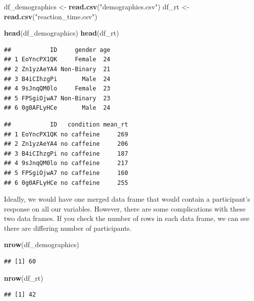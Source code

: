 \documentclass[
]{book}
\newenvironment{Shaded}{\begin{snugshade}}{\end{snugshade}}
\newcommand{\FunctionTok}[1]{\textcolor[rgb]{0.13,0.29,0.53}{\textbf{#1}}}
\newcommand{\NormalTok}[1]{#1}
\newcommand{\OtherTok}[1]{\textcolor[rgb]{0.56,0.35,0.01}{#1}}
\newcommand{\StringTok}[1]{\textcolor[rgb]{0.31,0.60,0.02}{#1}}
\begin{document}
\begin{Shaded}
\begin{Highlighting}[]
\NormalTok{df\_demographics }\OtherTok{\textless{}{-}} \FunctionTok{read.csv}\NormalTok{(}\StringTok{"demographics.csv"}\NormalTok{)}
\NormalTok{df\_rt }\OtherTok{\textless{}{-}} \FunctionTok{read.csv}\NormalTok{(}\StringTok{"reaction\_time.csv"}\NormalTok{)}

\FunctionTok{head}\NormalTok{(df\_demographics)}
\FunctionTok{head}\NormalTok{(df\_rt)}
\end{Highlighting}
\end{Shaded}

\begin{verbatim}
##           ID     gender age
## 1 EoYncPX1QK     Female  24
## 2 Zn1yzAeYA4 Non-Binary  21
## 3 B4iCIhzgPi       Male  24
## 4 9sJnqQM0lo     Female  23
## 5 FPSgiOjwA7 Non-Binary  23
## 6 0g0AFLyHCe       Male  24
\end{verbatim}

\begin{verbatim}
##           ID   condition mean_rt
## 1 EoYncPX1QK no caffeine     269
## 2 Zn1yzAeYA4 no caffeine     206
## 3 B4iCIhzgPi no caffeine     187
## 4 9sJnqQM0lo no caffeine     217
## 5 FPSgiOjwA7 no caffeine     160
## 6 0g0AFLyHCe no caffeine     255
\end{verbatim}

Ideally, we would have one merged data frame that would contain a participant's response on all our variables. However, there are some complications with these two data frames. If you check the number of rows in each data frame, we can see there are differing number of participants.

\begin{Shaded}
\begin{Highlighting}[]
\FunctionTok{nrow}\NormalTok{(df\_demographics)}
\end{Highlighting}
\end{Shaded}

\begin{verbatim}
## [1] 60
\end{verbatim}

\begin{Shaded}
\begin{Highlighting}[]
\FunctionTok{nrow}\NormalTok{(df\_rt)}
\end{Highlighting}
\end{Shaded}

\begin{verbatim}
## [1] 42
\end{verbatim}
\end{document}
